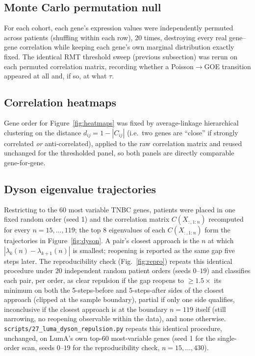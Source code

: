 \documentclass[11pt]{article}
\begin{document}
\subsection{Monte Carlo permutation null}

For each cohort, each gene's expression values were independently
permuted across patients (shuffling within each row), 20 times,
destroying every real gene--gene correlation while keeping each gene's
own marginal distribution exactly fixed. The identical RMT threshold
sweep (previous subsection) was rerun on each permuted correlation
matrix, recording whether a Poisson$\to$GOE transition appeared at all
and, if so, at what $\tau$.

\subsection{Correlation heatmaps}

Gene order for Figure~\ref{fig:heatmaps} was fixed by average-linkage
hierarchical clustering on the distance $d_{ij}=1-|C_{ij}|$ (i.e.\ two
genes are ``close'' if strongly correlated \emph{or}
anti-correlated), applied to the raw correlation matrix and reused
unchanged for the thresholded panel, so both panels are directly
comparable gene-for-gene.

\subsection{Dyson eigenvalue trajectories}

Restricting to the 60 most variable TNBC genes, patients were placed in
one fixed random order (seed 1) and the correlation matrix
$C(X_{:,1:n})$ recomputed for every $n=15,\dots,119$; the top 8
eigenvalues of each $C(X_{:,1:n})$ form the trajectories in
Figure~\ref{fig:dyson}. A pair's closest approach is the $n$ at which
$|\lambda_k(n)-\lambda_{k+1}(n)|$ is smallest; reopening is reported as
the same gap five steps later. The reproducibility check
(Fig.~\ref{fig:repro}) repeats this identical procedure under 20
independent random patient orders (seeds $0$--$19$) and classifies each
pair, per order, as clear repulsion if the gap reopens to
$\ge\!1.5\times$ its minimum on both the 5-steps-before and
5-steps-after sides of the closest approach (clipped at the sample
boundary), partial if only one side qualifies, inconclusive if the
closest approach is at the boundary $n=119$ itself (still narrowing,
no reopening observable within the data), and none otherwise.
\texttt{scripts/27\_luma\_dyson\_repulsion.py} repeats this identical
procedure, unchanged, on LumA's own top-60 most-variable genes
(seed 1 for the single-order scan, seeds $0$--$19$ for the
reproducibility check, $n=15,\dots,430$).
\end{document}
